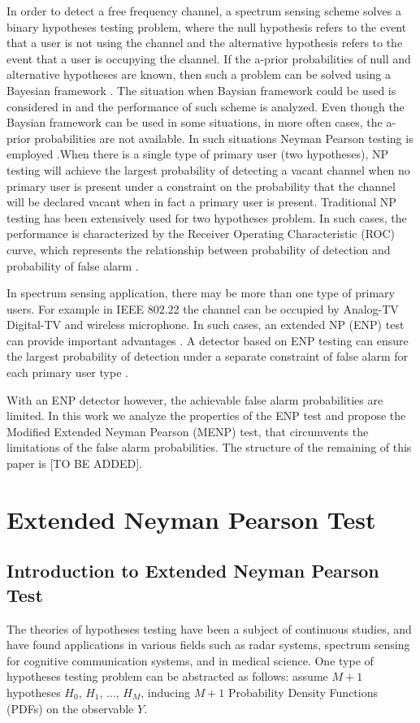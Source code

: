 \documentclass[12pt,journal,a4paper,twoside,onecolumn]{IEEEtran}
\begin{document}
\begin{spacing}{2.5}
In order to detect a free frequency channel, a spectrum sensing scheme solves a binary hypotheses testing problem, where the null hypothesis refers to the event that a user is not using the channel and the alternative hypothesis refers to the event that a user is occupying the channel. If the a-prior probabilities of null and alternative hypotheses are known, then such a problem can be solved using a Bayesian framework \cite{poor1994introduction}. The situation when Baysian framework could be used is considered in \cite{zeng2010review} and the performance of such scheme is analyzed.
Even though the Baysian framework can be used in some situations, in more often cases, the a-prior probabilities are not available. In such situations Neyman Pearson testing is employed \cite{poor1994introduction}.When there is a single type of primary user (two hypotheses), NP testing will achieve the largest probability of detecting a vacant channel when no primary user is present under a constraint on the probability that the channel will be declared vacant when in fact a primary user is present.
Traditional NP testing has been extensively used for two hypotheses problem. In such cases,  the performance is characterized by the Receiver Operating Characteristic (ROC) curve, which represents the relationship between probability of detection and probability of false alarm \cite{poor1994introduction}.

In spectrum sensing application, there may be more than one type of primary users. For example in IEEE 802.22 \cite{shellhammer2008spectrum} the channel can be occupied by Analog-TV Digital-TV and wireless microphone. In such cases, an extended NP (ENP) test can provide important advantages \cite{zhang1999desig}. A detector based on ENP testing can ensure the largest probability of detection under a separate constraint of false alarm for each primary user type \cite{LehmannTest}.

With an ENP detector however, the achievable false alarm probabilities are limited. In this work we analyze the properties of the ENP test and propose the Modified Extended Neyman Pearson (MENP) test, that circumvents the limitations of the false alarm probabilities. The structure of the remaining of this paper is [TO BE ADDED].

\section{Extended Neyman Pearson Test}

\subsection{Introduction to Extended Neyman Pearson Test}
The theories of hypotheses testing have been a subject of continuous studies, and have found applications in various fields such as radar systems, spectrum sensing for cognitive communication systems, and in  medical science. One type of hypotheses testing problem can be abstracted as  follows: assume $M+1$  hypotheses $H_0$, $H_1$, ..., $H_{M}$, inducing $M+1$  Probability Density Functions (PDFs) on the observable $Y$.


\end{spacing}
\end{document}
